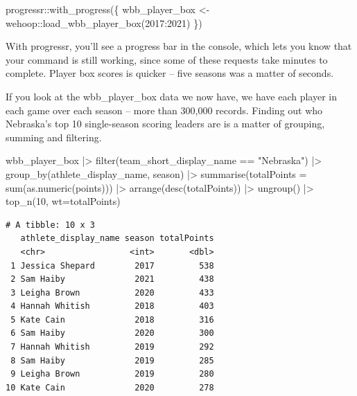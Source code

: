 \documentclass[
  letterpaper,
  DIV=11,
  numbers=noendperiod]{scrreprt}
\newenvironment{Shaded}{\begin{snugshade}}{\end{snugshade}}
\newcommand{\AttributeTok}[1]{\textcolor[rgb]{0.40,0.45,0.13}{#1}}
\newcommand{\DecValTok}[1]{\textcolor[rgb]{0.68,0.00,0.00}{#1}}
\newcommand{\FunctionTok}[1]{\textcolor[rgb]{0.28,0.35,0.67}{#1}}
\newcommand{\NormalTok}[1]{\textcolor[rgb]{0.00,0.23,0.31}{#1}}
\newcommand{\OtherTok}[1]{\textcolor[rgb]{0.00,0.23,0.31}{#1}}
\newcommand{\SpecialCharTok}[1]{\textcolor[rgb]{0.37,0.37,0.37}{#1}}
\newcommand{\StringTok}[1]{\textcolor[rgb]{0.13,0.47,0.30}{#1}}
\begin{document}
\begin{Shaded}
\begin{Highlighting}[]
\NormalTok{progressr}\SpecialCharTok{::}\FunctionTok{with\_progress}\NormalTok{(\{}
\NormalTok{  wbb\_player\_box }\OtherTok{\textless{}{-}}\NormalTok{ wehoop}\SpecialCharTok{::}\FunctionTok{load\_wbb\_player\_box}\NormalTok{(}\DecValTok{2017}\SpecialCharTok{:}\DecValTok{2021}\NormalTok{)}
\NormalTok{\})}
\end{Highlighting}
\end{Shaded}

With progressr, you'll see a progress bar in the console, which lets you
know that your command is still working, since some of these requests
take minutes to complete. Player box scores is quicker -- five seasons
was a matter of seconds.

If you look at the wbb\_player\_box data we now have, we have each
player in each game over each season -- more than 300,000 records.
Finding out who Nebraska's top 10 single-season scoring leaders are is a
matter of grouping, summing and filtering.

\begin{Shaded}
\begin{Highlighting}[]
\NormalTok{wbb\_player\_box }\SpecialCharTok{|\textgreater{}} 
  \FunctionTok{filter}\NormalTok{(team\_short\_display\_name }\SpecialCharTok{==} \StringTok{"Nebraska"}\NormalTok{) }\SpecialCharTok{|\textgreater{}} 
  \FunctionTok{group\_by}\NormalTok{(athlete\_display\_name, season) }\SpecialCharTok{|\textgreater{}} 
  \FunctionTok{summarise}\NormalTok{(}\AttributeTok{totalPoints =} \FunctionTok{sum}\NormalTok{(}\FunctionTok{as.numeric}\NormalTok{(points))) }\SpecialCharTok{|\textgreater{}} 
  \FunctionTok{arrange}\NormalTok{(}\FunctionTok{desc}\NormalTok{(totalPoints)) }\SpecialCharTok{|\textgreater{}}
  \FunctionTok{ungroup}\NormalTok{() }\SpecialCharTok{|\textgreater{}}
  \FunctionTok{top\_n}\NormalTok{(}\DecValTok{10}\NormalTok{, }\AttributeTok{wt=}\NormalTok{totalPoints)}
\end{Highlighting}
\end{Shaded}

\begin{verbatim}
# A tibble: 10 x 3
   athlete_display_name season totalPoints
   <chr>                 <int>       <dbl>
 1 Jessica Shepard        2017         538
 2 Sam Haiby              2021         438
 3 Leigha Brown           2020         433
 4 Hannah Whitish         2018         403
 5 Kate Cain              2018         316
 6 Sam Haiby              2020         300
 7 Hannah Whitish         2019         292
 8 Sam Haiby              2019         285
 9 Leigha Brown           2019         280
10 Kate Cain              2020         278
\end{verbatim}
\end{document}
